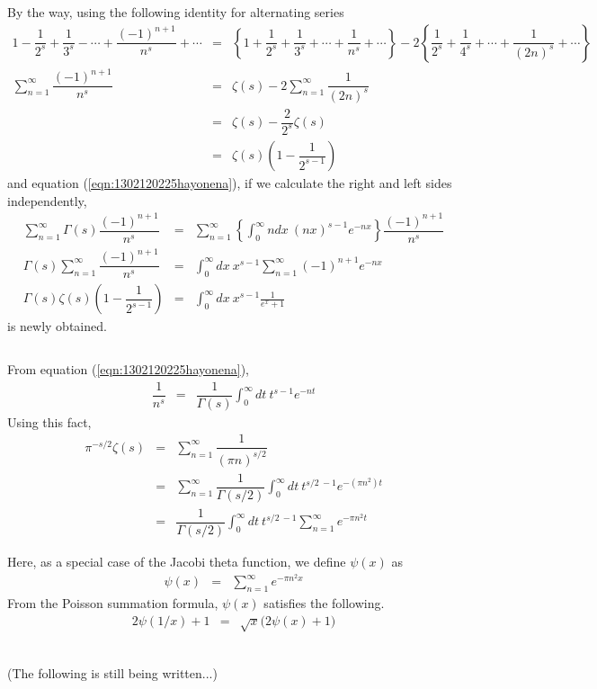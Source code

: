 \documentclass[uplatex,a4j,12pt,dvipdfmx]{jsarticle}
\begin{document}
By the way, using the following identity for alternating series
\begin{eqnarray}
	1
	-
	\dfrac{1}{2^{s}}
	+
	\dfrac{1}{3^{s}}
	-
	\cdots
	+
	\dfrac{(-1)^{n+1}}{n^{s}}
	+
	\cdots
	&=&
	\left\{
	1
	+
	\dfrac{1}{2^{s}}
	+
	\dfrac{1}{3^{s}}
	+
	\cdots
	+
	\dfrac{1}{n^{s}}
	+
	\cdots
	\right\}
	-
	2
	\left\{
	\dfrac{1}{2^{s}}
	+
	\dfrac{1}{4^{s}}
	+
	\cdots
	+
	\dfrac{1}{(2n)^{s}}
	+
	\cdots
	\right\}
	\nonumber \\
	\sum_{n=1}^{\infty}
	\dfrac{(-1)^{n+1}}{n^{s}}
	&=&
	\zeta(s)
	-
	2
	\sum_{n=1}^{\infty}
	\dfrac{1}{(2n)^{s}}
	\nonumber \\ &=&
	\zeta(s)
	-
	\dfrac{2}{2^{s}}
	\zeta(s)
	\nonumber \\ &=&
	\zeta(s)
	\left(
	1
	-
	\dfrac{1}{2^{s-1}}
	\right)
\end{eqnarray}
and equation (\ref{eqn:1302120225hayonena}), if we calculate the right and left sides independently,
\begin{eqnarray}
	\sum_{n=1}^{\infty}
	\Gamma(s)
	\dfrac{(-1)^{n+1}}{n^{s}}
	&=&
	\sum_{n=1}^{\infty}
	\left\{
	\int^{\infty}_{0}
	\!\! ndx
	\ \! (nx)^{s-1} e^{-nx}
	\right\}
	\dfrac{(-1)^{n+1}}{n^{s}}
	\nonumber \\
	\Gamma(s)
	\sum_{n=1}^{\infty}
	\dfrac{(-1)^{n+1}}{n^{s}}
	&=&
	\int^{\infty}_{0}
	\!\! dx
	\ \! x^{s-1}
	\sum_{n=1}^{\infty}
	(-1)^{n+1}
	e^{-nx}
	\nonumber \\
	\Gamma(s)
	\zeta(s)
	\left(
	1
	-
	\dfrac{1}{2^{s-1}}
	\right)
	&=&
	\int^{\infty}_{0}
	\!\! dx
	\ \! x^{s-1}
	\frac{1}{e^{x} + 1}
\end{eqnarray}
is newly obtained.

${}$

From equation (\ref{eqn:1302120225hayonena}),
\begin{eqnarray}
	\dfrac{1}{n^{s}}
	&=&
	\dfrac{1}{\Gamma(s)}
	\int^{\infty}_{0}
	dt \ \! t^{s-1} e^{-nt}
\end{eqnarray}
Using this fact,
\begin{eqnarray}
	\pi^{-s/2}
	\zeta(s)
	&=&
	\sum_{n=1}^{\infty}
	\dfrac{1}{(\pi n )^{s/2}}
	\nonumber \\ &=&
	\sum_{n=1}^{\infty}
	\dfrac{1}{\Gamma(s/2)}
	\int^{\infty}_{0}
	dt \ \! t^{s/2 \ \! -1} e^{-(\pi n^{2})t}
	\nonumber \\ &=&
	\dfrac{1}{\Gamma(s/2)}
	\int^{\infty}_{0}
	dt \ \! t^{s/2 \ \! -1}
	\sum_{n=1}^{\infty}
	e^{- \pi n^{2} t}
\end{eqnarray}

Here, as a special case of the Jacobi theta function, we define $\psi(x)$ as
\begin{eqnarray}
	\psi(x)
	&=&
	\sum_{n=1}^{\infty}
	e^{- \pi n^{2} x}
\end{eqnarray}
From the Poisson summation formula,
$\psi(x)$ satisfies the following.
\begin{eqnarray}
	2 \psi ( 1/x )
	+
	1
	&=&
	\sqrt{x}
	\Big( 2 \psi(x) + 1 \Big)
\end{eqnarray}

\ \\

(The following is still being written...)
\end{document}
